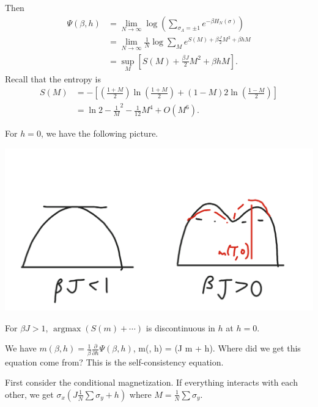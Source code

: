 \documentclass[12pt]{book}
\theoremstyle{norm}
\begin{document}
Then
\begin{align}
\Psi(\beta, h)&=\lim_{N\to \infty} \log\left( {\sum_{\sigma_\Lambda = \pm1} e^{-\beta H_N(\sigma)}} \right)\\
&= \lim_{N\to \infty} \frac{1}{N} \log \sum_M e^{S(M)+\beta \frac{J}{2}M^2 + \beta h M}\\
&=\sup_M [S(M) + \frac{\beta J}{2}M^2 + \beta hM].
\end{align}
Recall that the entropy is 
\begin{align}
S(M) &= -\left[ {\left( {\frac{1+M}{2}} \right) \ln \left( {\frac{1+M}{2}} \right) + \left( {1-M} \right){2}\ln \left( {\frac{1-M}{2}} \right)} \right]\\
&=\ln 2 - \frac{1}{M}^2  - \frac{1}{12}M^4 + O(M^6).
\end{align}

For $h=0$, we have the following picture. 

\begin{center}\includegraphics[scale=.25]{images/4-26-4}\end{center}


For $\beta J>1$, $\operatorname{argmax}(S(m) +\cdots)$ is discontinuous in $h$ at $h=0$.

We have $m(\beta,h)= \frac{1}{\beta} \frac{\partial}{\partial h}\Psi(\beta, h)$, 
\be
m(\beta, h) = \tanh(\beta J m + \beta h).
\ee
Where did we get this equation come from? This is the self-consistency equation. 

First consider the conditional magnetization. If everything interacts with each other, we get $\sigma_x(J\frac{1}{N} \sum \sigma_y + h)$ where $M=\frac{1}{N} \sum \sigma_y$. %
\end{document}
